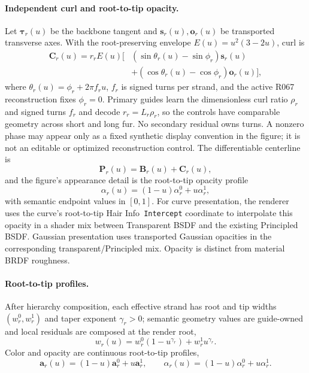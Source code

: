 \paragraph{Independent curl and root-to-tip opacity.}
Let $\boldsymbol{\tau}_r(u)$ be the backbone tangent and
$\mathbf{s}_r(u),\mathbf{o}_r(u)$ be transported transverse axes. With the
root-preserving envelope $E(u)=u^2(3-2u)$, curl is
\begin{equation}
\begin{split}
    \mathbf{C}_r(u)=r_rE(u)\big[&
    (\sin\theta_r(u)-\sin\phi_r)\mathbf{s}_r(u)\\
    &+(\cos\theta_r(u)-\cos\phi_r)\mathbf{o}_r(u)\big],
\end{split}
\end{equation}
where $\theta_r(u)=\phi_r+2\pi f_ru$, $f_r$ is signed turns per strand, and
the active R067 reconstruction fixes $\phi_r=0$. Primary guides learn the
dimensionless curl ratio $\rho_r$ and signed turns $f_r$ and decode
$r_r=L_r\rho_r$, so the controls have comparable geometry across short and
long fur. No secondary residual owns turns. A nonzero phase may appear only as
a fixed synthetic display convention in the figure; it is not an editable or
optimized reconstruction control. The differentiable centerline is
\begin{equation}
    \mathbf{P}_r(u)=\mathbf{B}_r(u)+\mathbf{C}_r(u),
\end{equation}
and the figure's appearance detail is the root-to-tip opacity profile
\begin{equation}
    \alpha_r(u)=(1-u)\alpha_r^0+u\alpha_r^1,
\end{equation}
with semantic endpoint values in $[0,1]$. For curve presentation, the renderer
uses the curve's root-to-tip Hair Info~\texttt{Intercept} coordinate to interpolate this
opacity in a shader mix between Transparent BSDF and the existing Principled
BSDF. Gaussian presentation uses transported Gaussian opacities in the
corresponding transparent/Principled mix. Opacity is distinct from material
BRDF roughness.

\paragraph{Root-to-tip profiles.}
After hierarchy composition, each effective strand has root and tip widths
$(w^0_r,w^1_r)$ and taper exponent $\gamma_r>0$; semantic geometry values are
guide-owned and local residuals are composed at the render root,
\begin{equation}
    w_r(u)=w^0_r(1-u^{\gamma_r})+w^1_ru^{\gamma_r}.
\end{equation}
Color and opacity are continuous root-to-tip profiles,
\begin{equation}
    \mathbf{a}_r(u)=(1-u)\mathbf{a}^0_r+u\mathbf{a}^1_r,
    \qquad
    \alpha_r(u)=(1-u)\alpha^0_r+u\alpha^1_r.
\end{equation}

